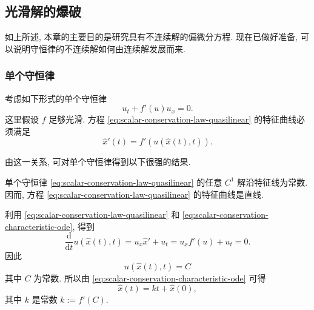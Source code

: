 \subsection{光滑解的爆破}\label{sec:conservation-smooth-blowup}

如上所述, 本章的主要目的是研究具有不连续解的偏微分方程. 现在已做好准备, 可以说明守恒律的不连续解如何由连续解发展而来.

\subsubsection{单个守恒律}\label{subsec:scalar-conservation-blowup}

考虑如下形式的单个守恒律
\begin{equation}\label{eq:scalar-conservation-law-quasilinear}
u_t+f'(u)u_x=0.
\end{equation}
这里假设 $f$ 足够光滑. 方程 \eqref{eq:scalar-conservation-law-quasilinear} 的特征曲线必须满足
\begin{equation}\label{eq:scalar-conservation-characteristic-ode}
\hat x'(t)=f'(u(\hat x(t),t)).
\end{equation}


由这一关系, 可对单个守恒律得到以下很强的结果.

\begin{Theorem}
\label{thm:scalar-constant-characteristics}
单个守恒律 \eqref{eq:scalar-conservation-law-quasilinear} 的任意 $C^1$ 解沿特征线为常数. 因而, 方程 \eqref{eq:scalar-conservation-law-quasilinear} 的特征曲线是直线.
\end{Theorem}

\begin{Proof}
利用 \eqref{eq:scalar-conservation-law-quasilinear} 和 \eqref{eq:scalar-conservation-characteristic-ode}, 得到
\begin{equation}\label{eq:scalar-solution-constant-along-characteristics}
\dfrac{\mathrm{d}}{\mathrm{d}t}u(\hat x(t),t)=u_x\hat x'+u_t=u_xf'(u)+u_t=0.
\end{equation}
因此
\begin{equation}\label{eq:scalar-characteristic-constant-value}
u(\hat x(t),t)=C
\end{equation}
其中 $C$ 为常数. 所以由 \eqref{eq:scalar-conservation-characteristic-ode} 可得
\begin{equation}\label{eq:scalar-straight-characteristic-line}
\hat x(t)=kt+\hat x(0),
\end{equation}
其中 $k$ 是常数 $k:=f'(C)$.
\end{Proof}

